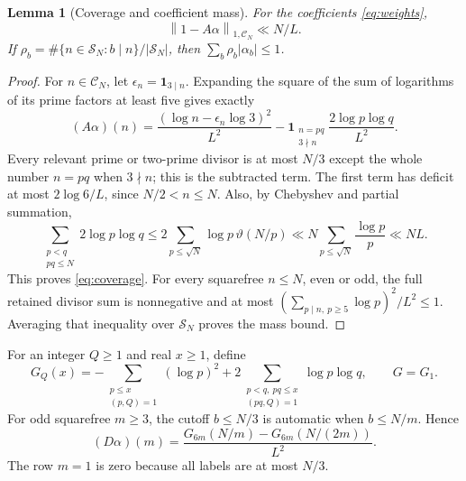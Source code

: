 \documentclass[11pt,letterpaper]{article}
\numberwithin{equation}{section}
\newtheorem{lemma}[theorem]{Lemma}
\theoremstyle{definition}
\theoremstyle{remark}
\newcommand{\ind}{\mathbf 1}
\newcommand{\norm}[1]{\left\lVert#1\right\rVert}
\begin{document}
\begin{lemma}[Coverage and coefficient mass]\label{lem:coverage}
For the coefficients \eqref{eq:weights},
\begin{equation}\label{eq:coverage}
 \norm{1-A\alpha}_{1,\mathcal C_N}\ll N/L.
\end{equation}
If $\rho_b=\#\{n\in\mathcal S_N:b\mid n\}/|\mathcal S_N|$, then
$\sum_b\rho_b|\alpha_b|\le1$.
\end{lemma}
\begin{proof}
For $n\in\mathcal C_N$, let $\epsilon_n=\ind_{3\mid n}$. Expanding the square
of the sum of logarithms of its prime factors at least five gives exactly
\begin{equation}\label{eq:coverage-exact}
 (A\alpha)(n)=\frac{(\log n-\epsilon_n\log3)^2}{L^2}
 -\ind_{\substack{n=pq\\3\nmid n}}\frac{2\log p\log q}{L^2}.
\end{equation}
Every relevant prime or two-prime divisor is at most $N/3$ except the
whole number $n=pq$ when $3\nmid n$; this is the subtracted term.
The first term has deficit at most $2\log6/L$, since
$N/2<n\le N$. Also, by Chebyshev and partial summation,
\[
 \sum_{\substack{p<q\\pq\le N}}2\log p\log q
 \le2\sum_{p\le\sqrt N}\log p\,\vartheta(N/p)
 \ll N\sum_{p\le\sqrt N}\frac{\log p}{p}\ll NL.
\]
This proves \eqref{eq:coverage}. For every squarefree $n\le N$, even or odd,
the full retained divisor sum is nonnegative and at most
$(\sum_{p\mid n,\ p\ge5}\log p)^2/L^2\le1$.
Averaging that inequality over $\mathcal S_N$ proves the mass bound.
\end{proof}

For an integer $Q\ge1$ and real $x\ge1$, define
\[
 G_Q(x)=-\sum_{\substack{p\le x\\(p,Q)=1}}(\log p)^2
     +2\sum_{\substack{p<q,\ pq\le x\\(pq,Q)=1}}\log p\log q,
 \qquad G=G_1.
\]
For odd squarefree $m\ge3$, the cutoff $b\le N/3$ is automatic when
$b\le N/m$. Hence
\begin{equation}\label{eq:flux-G}
 (D\alpha)(m)=\frac{G_{6m}(N/m)-G_{6m}(N/(2m))}{L^2}.
\end{equation}
The row $m=1$ is zero because all labels are at most $N/3$.
\end{document}
